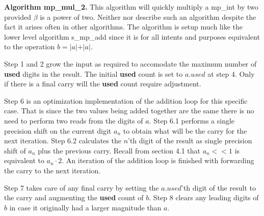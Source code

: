 \documentclass[b5paper]{book}
\begin{document}
\textbf{Algorithm mp\_mul\_2.}
This algorithm will quickly multiply a mp\_int by two provided $\beta$ is a power of two.  Neither \cite{TAOCPV2} nor \cite{HAC} describe such 
an algorithm despite the fact it arises often in other algorithms.  The algorithm is setup much like the lower level algorithm s\_mp\_add since 
it is for all intents and purposes equivalent to the operation $b = \vert a \vert + \vert a \vert$.  

Step 1 and 2 grow the input as required to accomodate the maximum number of \textbf{used} digits in the result.  The initial \textbf{used} count
is set to $a.used$ at step 4.  Only if there is a final carry will the \textbf{used} count require adjustment.

Step 6 is an optimization implementation of the addition loop for this specific case.  That is since the two values being added together 
are the same there is no need to perform two reads from the digits of $a$.  Step 6.1 performs a single precision shift on the current digit $a_n$ to
obtain what will be the carry for the next iteration.  Step 6.2 calculates the $n$'th digit of the result as single precision shift of $a_n$ plus
the previous carry.  Recall from section 4.1 that $a_n << 1$ is equivalent to $a_n \cdot 2$.  An iteration of the addition loop is finished with 
forwarding the carry to the next iteration.

Step 7 takes care of any final carry by setting the $a.used$'th digit of the result to the carry and augmenting the \textbf{used} count of $b$.  
Step 8 clears any leading digits of $b$ in case it originally had a larger magnitude than $a$.
\end{document}
